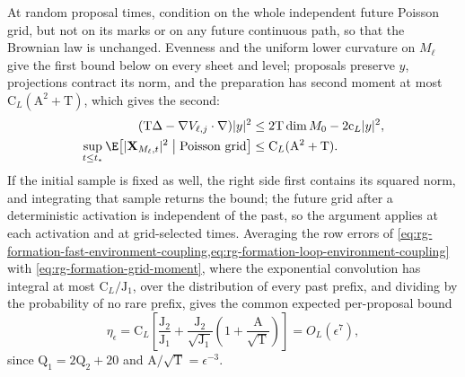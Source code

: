 At random proposal times, condition on the whole independent future Poisson
grid, but not on its marks or on any
future continuous path, so that the Brownian law is unchanged. Evenness and
the uniform lower curvature on \(M_\ell\) give the first bound below on every
sheet and level; proposals preserve \(y\), projections contract its norm, and
the preparation has second moment at most \(\mathrm C_L(\mathrm A^2+\mathrm T)\),
which gives the second:
\begin{align}
 (\mathrm T\Delta-\nabla V_{\ell,j}\cdot\nabla)|y|^2
 &\le2\mathrm T\dim M_0-2\mathrm c_L|y|^2,
 \label{eq:rg-formation-grid-moment-generator}\\
 \sup_{t\le t_*}\E\bigl[|\mathbf X_{M_\ell,t}|^2\bigm|\text{Poisson grid}\bigr]
 &\le \mathrm C_L(\mathrm A^2+\mathrm T).
 \label{eq:rg-formation-grid-moment}
\end{align}
If the initial sample is fixed as well, the right side first contains its
squared norm, and integrating that sample returns the bound; the future grid
after a deterministic activation is independent of the past, so the argument
applies at each activation and at grid-selected times. Averaging the row
errors of
\cref{eq:rg-formation-fast-environment-coupling,eq:rg-formation-loop-environment-coupling}
with \cref{eq:rg-formation-grid-moment}, where the exponential convolution has
integral at most \(\mathrm C_L/\mathrm J_1\), over the distribution of every
past prefix, and dividing by the probability of no rare prefix, gives the
common expected per-proposal bound
\begin{equation}
 \eta_\epsilon
 =\mathrm C_L\left[\frac{\mathrm J_2}{\mathrm J_1}
       +\frac{\mathrm J_2}{\sqrt{\mathrm J_1}}
                       \left(1+\frac{\mathrm A}{\sqrt{\mathrm T}}\right)\right]
 =O_L(\epsilon^7),
 \label{eq:rg-formation-averaged-environment-error}
\end{equation}
since \(\mathrm Q_1=2\mathrm Q_2+20\) and \(\mathrm A/\sqrt{\mathrm T}=\epsilon^{-3}\).

